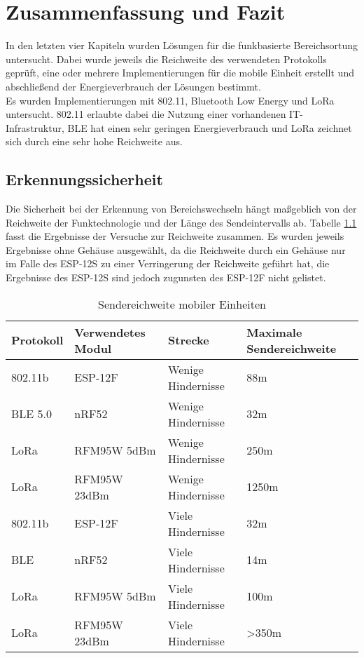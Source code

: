 \chapter{Zusammenfassung und Fazit}
\label{ch:fazit}
In den letzten vier Kapiteln wurden Lösungen für die funkbasierte Bereichsortung untersucht.
Dabei wurde jeweils die Reichweite des verwendeten Protokolls geprüft, eine oder mehrere Implementierungen für die mobile Einheit erstellt und abschließend der Energieverbrauch der Lösungen bestimmt. \\
Es wurden Implementierungen mit 802.11, Bluetooth Low Energy und LoRa untersucht. 
802.11 erlaubte dabei die Nutzung einer vorhandenen IT-Infrastruktur, BLE hat einen sehr geringen Energieverbrauch und LoRa zeichnet sich durch eine sehr hohe Reichweite aus.

\section{Erkennungssicherheit}
Die Sicherheit bei der Erkennung von Bereichswechseln hängt maßgeblich von der Reichweite der Funktechnologie und der Länge des Sendeintervalls ab.
Tabelle \ref{table:ranges} fasst die Ergebnisse der Versuche zur Reichweite zusammen. 
Es wurden jeweils Ergebnisse ohne Gehäuse ausgewählt, da die Reichweite durch ein Gehäuse nur im Falle des ESP-12S zu einer Verringerung der Reichweite geführt hat, die Ergebnisse des ESP-12S sind jedoch zugunsten des ESP-12F nicht gelistet.

\begin{table}[h]
	\centering
	\caption{Sendereichweite mobiler Einheiten}
	\label{table:ranges}
	\begin{tabular}{p{2cm}|p{3.5cm}|p{3.5cm}|p{3cm}}
		Protokoll & Verwendetes Modul & Strecke & Maximale Sendereichweite \\
		\hline
		802.11b & ESP-12F & Wenige Hindernisse & 88m \\
		BLE 5.0 & nRF52 & Wenige Hindernisse & 32m \\
		LoRa & RFM95W 5dBm & Wenige Hindernisse & 250m \\
		LoRa & RFM95W 23dBm & Wenige Hindernisse & 1250m \\
		\hline
		802.11b & ESP-12F  & Viele Hindernisse & 32m \\
		BLE & nRF52  & Viele Hindernisse & 14m \\
		LoRa & RFM95W 5dBm & Viele Hindernisse & 100m \\
		LoRa & RFM95W 23dBm & Viele Hindernisse & >350m \\
	\end{tabular}
\end{table}

